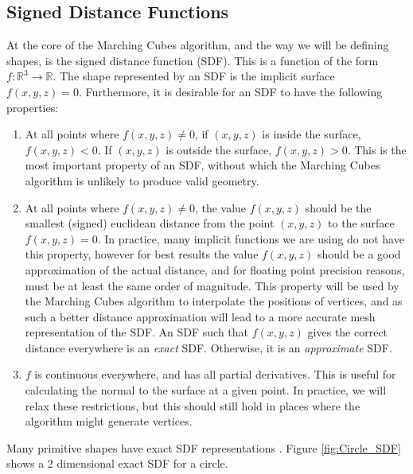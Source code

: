 \documentclass{article}
\begin{document}
\subsection{Signed Distance Functions}
\label{section:sdf}
At the core of the Marching Cubes algorithm, and the way we will be defining shapes, is the signed distance function (SDF). This is a function of the form $f:\mathbb{R}^3 \rightarrow \mathbb{R}$. The shape represented by an SDF is the implicit surface $f\left(x,y,z\right) = 0$. Furthermore, it is desirable for an SDF to have the following properties:
\begin{enumerate}[label=\roman*.]
\item At all points where $f\left(x,y,z\right) \neq 0$, if $\left(x,y,z\right)$ is inside the surface, $f\left(x,y,z\right) < 0$. If $\left(x,y,z\right)$ is outside the surface, $f\left(x,y,z\right) > 0$. This is the most important property of an SDF, without which the Marching Cubes algorithm is unlikely to produce valid geometry.
\item At all points where $f\left(x,y,z\right) \neq 0$, the value $f\left(x,y,z\right)$ should be the smallest (signed) euclidean distance from the point $\left(x,y,z\right)$ to the surface $f\left(x,y,z\right) = 0$. In practice, many implicit functions we are using do not have this property, however for best results the value $f\left(x,y,z\right)$ should be a good approximation of the actual distance, and for floating point precision reasons, must be at least the same order of magnitude. This property will be used by the Marching Cubes algorithm to interpolate the positions of vertices, and as such a better distance approximation will lead to a more accurate mesh representation of the SDF. An SDF such that $f\left(x,y,z\right)$ gives the correct distance everywhere is an \textit{exact} SDF. Otherwise, it is an \textit{approximate} SDF.
\item $f$ is continuous everywhere, and has all partial derivatives. This is useful for calculating the normal to the surface at a given point. In practice, we will relax these restrictions, but this should still hold in places where the algorithm might generate vertices.
\end{enumerate}
Many primitive shapes have exact SDF representations \cite{quilez:sdf}. Figure \ref{fig:Circle_SDF} shows a 2 dimensional exact SDF for a circle.
\end{document}
